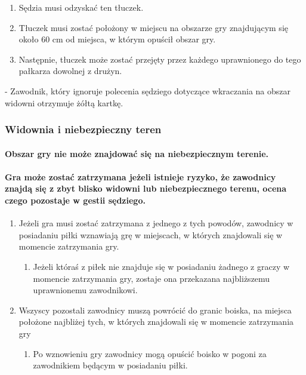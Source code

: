 \documentclass[12pt]{article}
\newcommand\yellowcard{\bgroup\color{yellow}\markoverwith{\textcolor{yellow}{\rule[-0.5ex]{2pt}{0.4pt}}}\ULon}
\begin{document}
\begin{enumerate}
\begin{enumerate}
		            \begin{enumerate}
			            \item
			                  Sędzia musi odzyskać ten tłuczek.
			            \item
			                  Tłuczek musi zostać położony w miejscu na obszarze gry znajdującym
			                  się około 60 cm od miejsca, w którym opuścił obszar gry.
			            \item
			                  Następnie, tłuczek może zostać przejęty przez każdego uprawnionego
			                  do tego pałkarza dowolnej z drużyn.
		            \end{enumerate}
	      \end{enumerate}
\end{enumerate}

\yellowcard{Żółta kartka} - Zawodnik, który ignoruje polecenia sędziego
dotyczące wkraczania na obszar widowni otrzymuje żółtą kartkę.

\subsubsection{Widownia i niebezpieczny teren}

\paragraph{Obszar gry nie może znajdować się na niebezpiecznym terenie.}

\paragraph{Gra może zostać zatrzymana jeżeli istnieje ryzyko, że
	zawodnicy znajdą się z zbyt blisko widowni lub niebezpiecznego terenu,
	ocena czego pozostaje w gestii sędziego.}

\begin{enumerate}
	\item
	      Jeżeli gra musi zostać zatrzymana z jednego z tych powodów, zawodnicy
	      w posiadaniu piłki wznawiają grę w miejscach, w których znajdowali się
	      w momencie zatrzymania gry.

	      \begin{enumerate}
		      \item
		            Jeżeli któraś z piłek nie znajduje się w posiadaniu żadnego z graczy
		            w momencie zatrzymania gry, zostaje ona przekazana najbliższemu
		            uprawnionemu zawodnikowi.
	      \end{enumerate}
	\item
	      Wszyscy pozostali zawodnicy muszą powrócić do granic boiska, na
	      miejsca położone najbliżej tych, w których znajdowali się w momencie
	      zatrzymania gry

	      \begin{enumerate}
		      \item
		            Po wznowieniu gry zawodnicy mogą opuścić boisko w pogoni za
		            zawodnikiem będącym w posiadaniu piłki.
	      \end{enumerate}
\end{enumerate}
\end{document}
